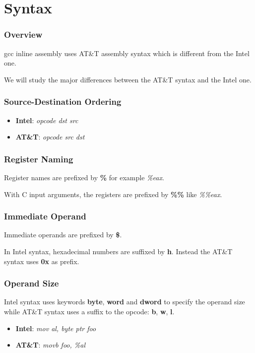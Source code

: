 %
%

\section{Syntax}


\begin{frame}
  \frametitle{Overview}

  gcc inline assembly uses AT\&T assembly syntax which is
  different from the Intel one.

  \nl

  We will study the major differences between the AT\&T syntax and the
  Intel one.
\end{frame}


\begin{frame}
  \frametitle{Source-Destination Ordering}

  \begin{itemize}
    \item
      \textbf{Intel}: \textit{opcode dst src}
    \item
      \textbf{AT\&T}: \textit{opcode src dst}
  \end{itemize}
\end{frame}


\begin{frame}
  \frametitle{Register Naming}

  Register names are prefixed by \textbf{\%} for example \textit{\%eax}.

  \nl

  With C input arguments, the registers are prefixed by \textbf{\%\%}
  like \textit{\%\%eax}.
\end{frame}


\begin{frame}
  \frametitle{Immediate Operand}

  Immediate operands are prefixed by \textbf{\$}.

  \nl

  In Intel syntax, hexadecimal numbers are suffixed by \textbf{h}.
  Instead the AT\&T syntax uses \textbf{0x} as prefix.
\end{frame}


\begin{frame}
  \frametitle{Operand Size}

  Intel syntax uses keywords \textbf{byte}, \textbf{word} and
  \textbf{dword} to specify the operand size while AT\&T syntax uses
  a suffix to the opcode: \textbf{b}, \textbf{w}, \textbf{l}.

  \begin{itemize}
    \item
      \textbf{Intel}: \textit{mov al, byte ptr foo}
    \item
      \textbf{AT\&T}: \textit{movb foo, \%al}
  \end{itemize}
\end{frame}

